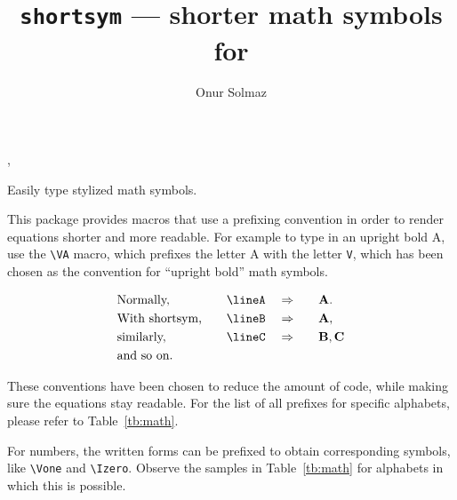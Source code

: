 \documentclass[]{article}
\title{\texttt{shortsym}\textnormal{ --- shorter math symbols for \LaTeXe}}
\author{Onur Solmaz}
\begin{document}
\maketitle

\begin{myverbbox}{\lineA}
\end{myverbbox}

\begin{myverbbox}{\lineB}
\VA
\end{myverbbox}

\begin{myverbbox}{\lineC}
\VB, \VC
\end{myverbbox}


Easily type stylized math symbols.

This package provides macros that use a prefixing convention in order to render
equations shorter and more readable.
For example to type in an
upright bold A, use the \verb+\VA+ macro, which prefixes the letter A
with the letter \verb+V+, which has been chosen
as the convention for ``upright bold'' math symbols.

\begin{alignat*}{4}
  &\text{Normally,}  & \lineA \quad &\Rightarrow \quad && \VA. \\
  &\text{With shortsym,} \quad  & \lineB \quad &\Rightarrow \quad && \VA, \\
  &\text{similarly,}  & \lineC \quad &\Rightarrow \quad && \VB, \VC \\
  &\text{and so on.}  &  & &&  \\
\end{alignat*}

These conventions have been chosen to reduce the amount of code,
while making sure the equations stay readable.
For the list of all prefixes for
specific alphabets, please refer to Table~\ref{tb:math}.

For numbers, the written forms can be prefixed to obtain corresponding symbols,
like \verb+\Vone+ and \verb+\Izero+. Observe the samples in Table~\ref{tb:math}
for alphabets in which this is possible.
\end{document}
